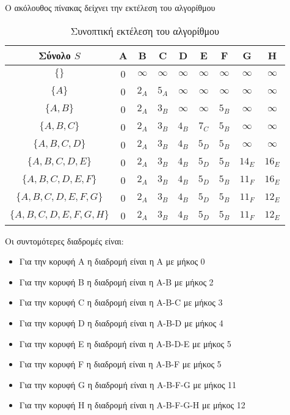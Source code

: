 Ο ακόλουθος πίνακας δείχνει την εκτέλεση του αλγορίθμου
\begin{table}[ht]
	\centering
	\label{tbl:dijkstra3}
	\begin{tabular}{|c|c|c|c|c|c|c|c|c|}
		\hline
		Σύνολο $S$            & A & B        & C        & D        & E        & F        & G        & H         \\ \hline
		$\{\}$                & 0 & $\infty$ & $\infty$ & $\infty$ & $\infty$ & $\infty$ & $\infty$ & $\infty$  \\ \hline
		$\{A\}$               & 0 & $2_A$    & $5_A$    & $\infty$ & $\infty$ & $\infty$ & $\infty$ & $\infty$  \\ \hline
		$\{A,Β\}$             & 0 & $2_A$    & $3_B$    & $\infty$ & $\infty$ & $5_B$    & $\infty$ & $\infty$  \\ \hline
		$\{A,B,C\}$           & 0 & $2_A$    & $3_B$    & $4_B$    & $7_C$    & $5_B$    & $\infty$ & $\infty$  \\ \hline
		$\{A,B,C,D\}$         & 0 & $2_A$    & $3_B$    & $4_B$    & $5_D$    & $5_B$    & $\infty$ & $\infty$  \\ \hline
		$\{A,B,C,D,E\}$       & 0 & $2_A$    & $3_B$    & $4_B$    & $5_D$    & $5_B$    & $14_E$   & $16_E$    \\ \hline			
		$\{A,B,C,D,E,F\}$     & 0 & $2_A$    & $3_B$    & $4_B$    & $5_D$    & $5_B$    & $11_F$   & $16_E$    \\ \hline			
		$\{A,B,C,D,E,F,G\}$    & 0 & $2_A$    & $3_B$    & $4_B$    & $5_D$    & $5_B$    & $11_F$   & $12_E$    \\ \hline			
		$\{A,B,C,D,E,F,G,H\}$ & 0 & $2_A$    & $3_B$    & $4_B$    & $5_D$    & $5_B$    & $11_F$   & $12_E$    \\ \hline
	\end{tabular}
	\caption{Συνοπτική εκτέλεση του αλγορίθμου}
\end{table}

Οι συντομότερες διαδρομές είναι:
\begin{itemize}[noitemsep]
\item Για την κορυφή A η διαδρομή είναι η A με μήκος 0
\item Για την κορυφή B η διαδρομή είναι η A-B με μήκος 2
\item Για την κορυφή C η διαδρομή είναι η A-B-C με μήκος 3
\item Για την κορυφή D η διαδρομή είναι η A-B-D με μήκος 4
\item Για την κορυφή E η διαδρομή είναι η A-B-D-E με μήκος 5
\item Για την κορυφή F η διαδρομή είναι η A-B-F με μήκος 5
\item Για την κορυφή G η διαδρομή είναι η A-B-F-G με μήκος 11
\item Για την κορυφή H η διαδρομή είναι η A-B-F-G-H με μήκος 12
\end{itemize}

